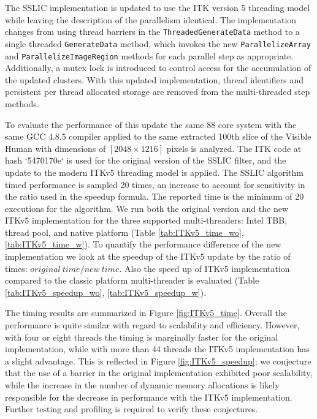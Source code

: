 \documentclass{InsightArticle}
\begin{document}
The SSLIC implementation is updated to use the ITK version 5 threading model
while leaving the description of the parallelism identical. The implementation
changes from using thread barriers in the \texttt{ThreadedGenerateData} method
to a single threaded \texttt{GenerateData} method, which invokes the new
\texttt{ParallelizeArray} and \texttt{ParallelizeImageRegion} methods for each
parallel step as appropriate. Additionally, a mutex lock is introduced to
control access for the accumulation of the updated clusters. With this updated
implementation, thread identifiers and persistent per thread allocated storage
are removed from the multi-threaded step methods.

To evaluate the performance of this update the same 88 core system with the same
GCC 4.8.5 compiler applied to the same extracted 100th slice of the Visible Human with
dimensions of $[2048 \times 1216 ]$ pixels is analyzed. The ITK code at hash
`5470170e` is used for the original version of the SSLIC filter, and the
update to the modern ITKv5 threading model is applied. The SSLIC algorithm
timed performance is sampled 20 times, an increase to account for sensitivity in
the ratio used in the speedup formula. The reported time is the minimum of 20
executions for the algorithm. We run both the original version and the new ITKv5
implementation for the three supported multi-threaders: Intel TBB, thread pool,
and native platform (Table \ref{tab:ITKv5_time_wo}, \ref{tab:ITKv5_time_w}). To
quantify the performance difference of the new implementation we look at the
speedup of the ITKv5 update by the ratio of times: $original\ time/new\ time$.
Also the speed up of ITKv5 implementation compared to the classic platform
multi-threader is evaluated (Table \ref{tab:ITKv5_speedup_wo},
\ref{tab:ITKv5_speedup_w}).

The timing results are summarized in Figure \ref{fig:ITKv5_time}. Overall the
performance is quite similar with regard to scalability and efficiency.
However, with four or eight threads the timing is marginally faster for the
original implementation, while with more than 44 threads the ITKv5
implementation has a slight advantage. This is reflected in Figure
\ref{fig:ITKv5_speedup}; we conjecture that the use of a barrier in the original
implementation exhibited poor scalability, while the increase in the number of
dynamic memory allocations is likely responsible for the decrease in performance with the
ITKv5 implementation. Further testing and profiling is required to verify these
conjectures.
\end{document}
